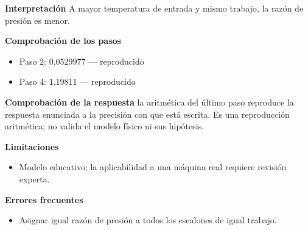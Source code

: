 \documentclass[10pt,openany]{book}
\begin{document}
\begin{tcolorbox}[title={Problema resuelto 3}, studiumworked, breakable]
\noindent\textbf{Interpretación}
A mayor temperatura de entrada y mismo trabajo, la razón de presión es menor.

\noindent\textbf{Comprobación de los pasos}
\begin{itemize}
\item Paso 2: $0.0529977$ — reproducido
\item Paso 4: $1.19811$ — reproducido
\end{itemize}

\noindent\textbf{Comprobación de la respuesta} la aritmética del último paso reproduce la respuesta enunciada a la precisión con que está escrita. Es una reproducción aritmética; no valida el modelo físico ni sus hipótesis.

\noindent\textbf{Limitaciones}
\begin{itemize}
\item Modelo educativo; la aplicabilidad a una máquina real requiere revisión experta.
\end{itemize}

\noindent\textbf{Errores frecuentes}
\begin{itemize}
\item Asignar igual razón de presión a todos los escalones de igual trabajo.
\end{itemize}
\end{tcolorbox}
\end{document}
